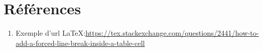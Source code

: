 \section*{Références}
\parindent0pt
\begin{enumerate}
	\item Exemple d'url \LaTeX :\url{https://tex.stackexchange.com/questions/2441/how-to-add-a-forced-line-break-inside-a-table-cell}
	\label{ref:LaTeX}
\end{enumerate}